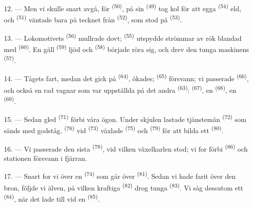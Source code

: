 12. --- Men vi skulle snart avgå, för  \textsuperscript{(50)}, på sin
 \textsuperscript{(49)} tog kol för att egga
 \textsuperscript{(54)} eld, och 
\textsuperscript{(51)} väntade bara på tecknet från 
\textsuperscript{(52)}, som stod på  \textsuperscript{(53)}.

13. --- Lokomotivets  \textsuperscript{(56)} mullrade dovt;
 \textsuperscript{(55)} utspydde strömmar av rök blandad med
 \textsuperscript{(60)}. En gäll 
\textsuperscript{(59)} ljöd och  \textsuperscript{(58)} började röra sig, och
drev den tunga maskinens  \textsuperscript{(57)}.

\VUsaut{3.0mm}
\VUsaut{3.0mm}

14. --- Tågets fart, medan det gick på  \textsuperscript{(64)}, ökades;
 \textsuperscript{(65)} försvann; vi passerade
 \textsuperscript{(66)}, och också en rad vagnar som var
uppställda på det andra  \textsuperscript{(63)}:
 \textsuperscript{(67)}, en 
\textsuperscript{(68)}, en  \textsuperscript{(69)}.


15. --- Sedan gled  \textsuperscript{(71)} förbi våra ögon. Under
skjulen lastade tjänstemän  \textsuperscript{(72)} som sänds med godståg.
 \textsuperscript{(76)} vid
 \textsuperscript{(73)} växlade 
\textsuperscript{(75)} och  \textsuperscript{(79)} för att bilda ett
 \textsuperscript{(80)}.

16. --- Vi passerade den sista  \textsuperscript{(78)}, vid vilken växelkarlen
stod; vi for förbi  \textsuperscript{(86)} och stationen försvann i
fjärran.

17. --- Snart for vi över en  \textsuperscript{(74)} som går över
 \textsuperscript{(81)}. Sedan vi hade farit över den bron, följde
vi älven, på vilken kraftiga  \textsuperscript{(82)} drog tunga
 \textsuperscript{(83)}. Vi såg dessutom ett
 \textsuperscript{(84)}, när det lade till vid en
 \textsuperscript{(85)}.

